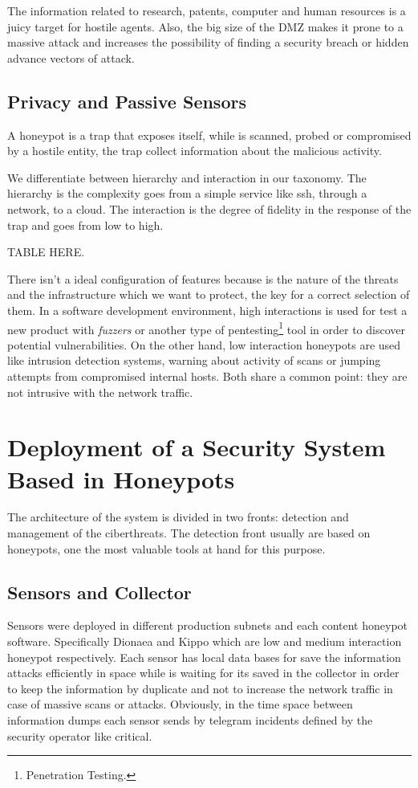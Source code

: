 \documentclass[a4paper]{llncs}
\begin{document}
The information related to research, patents, computer and human resources is a juicy target for hostile agents. Also, the big size of the DMZ %
 makes it prone to a massive attack and increases the possibility of finding a security breach or hidden advance vectors of attack.

\subsection{Privacy and Passive Sensors}
\label{sect:Privacy and Passive Sensors}
A honeypot is a trap that exposes itself, while is scanned, probed or compromised by a hostile entity, the trap collect information about the malicious activity.

We differentiate between hierarchy and interaction in our taxonomy. The hierarchy is the complexity goes from a simple service like ssh, through a network, to a cloud. The interaction is the degree of fidelity in the response of the trap and goes from low to high.

TABLE HERE.

There isn't a ideal configuration of features because is the nature of the threats and the infrastructure which we want to protect, the key for a correct selection of them. In a software development environment, high interactions is used for test a new product with {\it fuzzers} or another type of pentesting\footnote{Penetration Testing.} tool in order to discover potential vulnerabilities. On the other hand, low interaction honeypots are used like intrusion detection systems, warning about activity of scans or jumping attempts from compromised internal hosts. Both share a common point: they are not intrusive with the network traffic.

\section{Deployment of a Security System Based in Honeypots}

The architecture of the system is divided in two fronts: detection and management of the ciberthreats. The detection front usually are based on honeypots, one the most valuable tools at hand for this purpose.

\subsection{Sensors and Collector}

Sensors were deployed in different production subnets and each content honeypot software. Specifically Dionaea\cite{dionaea} and Kippo\cite{kippo} which are low and medium interaction honeypot respectively. Each sensor has local data bases for save the information attacks efficiently in space while is waiting for its saved in the collector in order to keep the information by duplicate and not to increase the network traffic in case of massive scans or attacks. Obviously, in the time space between information dumps each sensor sends by telegram incidents defined by the security operator like critical.
\end{document}
